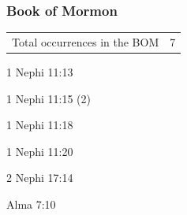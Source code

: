 	\subsubsection{Book of Mormon} %
		\label{VIRGIN-BOM}
	
		\begin{tabular}{ll}
			Total occurrences in the BOM & 7
		\end{tabular}
		
		\begin{compactdesc}
			\item[1 Nephi 11:13]
			\item[1 Nephi 11:15] (2)
			\item[1 Nephi 11:18]
			\item[1 Nephi 11:20]
			\item[2 Nephi 17:14]
			\item[Alma 7:10]
		\end{compactdesc}
		
	
		
		
	
		
		

